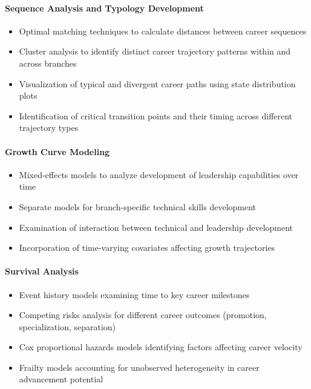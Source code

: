 \documentclass[../main.tex]{subfiles}
\begin{document}

\paragraph{Sequence Analysis and Typology Development}
\begin{itemize}
\item Optimal matching techniques to calculate distances between career sequences \parencite{joseph2012career}
\item Cluster analysis to identify distinct career trajectory patterns within and across branches
\item Visualization of typical and divergent career paths using state distribution plots
\item Identification of critical transition points and their timing across different trajectory types
\end{itemize}

\paragraph{Growth Curve Modeling}
\begin{itemize}
\item Mixed-effects models to analyze development of leadership capabilities over time \parencite{lme4slides2011}
\item Separate models for branch-specific technical skills development
\item Examination of interaction between technical and leadership development
\item Incorporation of time-varying covariates affecting growth trajectories
\end{itemize}

\paragraph{Survival Analysis}
\begin{itemize}
\item Event history models examining time to key career milestones
\item Competing risks analysis for different career outcomes (promotion, specialization, separation)
\item Cox proportional hazards models identifying factors affecting career velocity
\item Frailty models accounting for unobserved heterogeneity in career advancement potential
\end{itemize}
\end{document}
